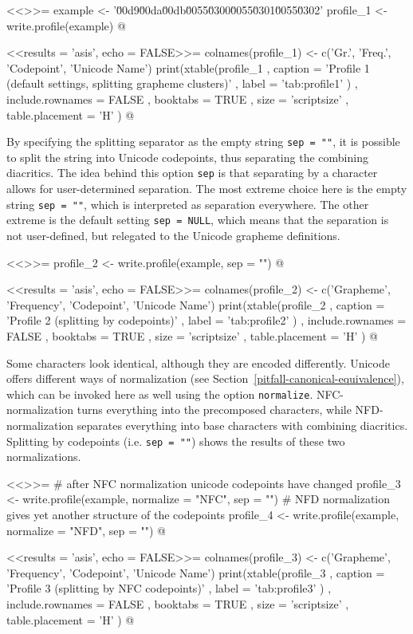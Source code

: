 <<>>=
example <- '\u00d9\u00da\u00db\u0055\u0300\u0055\u0301\u0055\u0302'
profile_1 <- write.profile(example)
@

<<results = 'asis', echo = FALSE>>=
colnames(profile_1) <- c('Gr.', 'Freq.', 'Codepoint', 'Unicode Name')
print(xtable(profile_1
        , caption = 'Profile 1 (default settings, splitting grapheme clusters)'
        , label = 'tab:profile1'
        )
  , include.rownames = FALSE
  , booktabs = TRUE
  , size = 'scriptsize'
  , table.placement = 'H'
  )
@

By specifying the splitting separator as the empty string
\texttt{sep~=~""}, it is possible to split the string into Unicode codepoints,
thus separating the combining diacritics. The idea behind this option
\texttt{sep} is that separating by a character allows for user-determined
separation. The most extreme choice here is the empty string \texttt{sep~=~""},
which is interpreted as separation everywhere. The other extreme is the default
setting \texttt{sep~=~NULL}, which means that the separation is not
user-defined, but relegated to the Unicode grapheme definitions.

<<>>=
profile_2 <- write.profile(example, sep = "")
@

<<results = 'asis', echo = FALSE>>=
colnames(profile_2) <- c('Grapheme', 'Frequency', 'Codepoint', 'Unicode Name')
print(xtable(profile_2
        , caption = 'Profile 2 (splitting by codepoints)'
        , label = 'tab:profile2'
        )
  , include.rownames = FALSE
  , booktabs = TRUE
  , size = 'scriptsize'
  , table.placement = 'H'
  )
@

Some characters look identical, although they are encoded differently.
Unicode offers different ways of normalization (see
Section~\ref{pitfall-canonical-equivalence}), which can be invoked here as well
using the option \texttt{normalize}. NFC-normalization turns everything into the
precomposed characters, while NFD-normalization separates everything into base
characters with combining diacritics. Splitting by codepoints (i.e. \texttt{sep~=~""}) shows the results of these two normalizations.

<<>>=
# after NFC normalization unicode codepoints have changed
profile_3 <- write.profile(example, normalize = "NFC", sep = "")
# NFD normalization gives yet another structure of the codepoints
profile_4 <- write.profile(example, normalize = "NFD", sep = "")
@

<<results = 'asis', echo = FALSE>>=
colnames(profile_3) <- c('Grapheme', 'Frequency', 'Codepoint', 'Unicode Name')
print(xtable(profile_3
        , caption = 'Profile 3 (splitting by NFC codepoints)'
        , label = 'tab:profile3'
        )
  , include.rownames = FALSE
  , booktabs = TRUE
  , size = 'scriptsize'
  , table.placement = 'H'
  )
@

